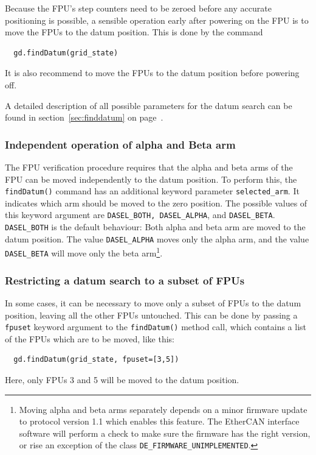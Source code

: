 \documentclass[11pt,a4paper]{report}
\begin{document}
Because the FPU's step counters need to be zeroed
before any accurate positioning is possible, a
sensible operation early after powering on
the FPU is to move the FPUs to the datum position.
This is done by the command

\begin{verbatim}
  gd.findDatum(grid_state)
\end{verbatim}

It is also recommend to move the FPUs to the datum position
before powering off. 

A detailed description of all possible
parameters for the datum search can be found in
section~\ref{sec:finddatum} on page~\pageref{sec:finddatum}.


\subsubsection{Independent operation of alpha and Beta arm}

The FPU verification procedure requires that the alpha and beta arms
of the FPU can be moved independently to the datum position.  To
perform this, the \texttt{findDatum()} command has an additional
keyword parameter \texttt{selected\_arm}. It indicates which arm
should be moved to the zero position. The possible values of this
keyword argument are \texttt{DASEL\_BOTH, DASEL\_ALPHA}, and
\texttt{DASEL\_BETA}.  \texttt{DASEL\_BOTH} is the default behaviour:
Both alpha and beta arm are moved to the datum position. The value
\texttt{DASEL\_ALPHA} moves only the alpha arm, and the value
\texttt{DASEL\_BETA} will move only the beta arm\footnote{Moving alpha
  and beta arms separately depends on a minor firmware update to
  protocol version 1.1 which enables this feature. The EtherCAN interface software
  will perform a check to make sure the firmware has the right
  version, or rise an exception of the class
  \texttt{DE\_FIRMWARE\_UNIMPLEMENTED}.}.


\subsubsection{Restricting a datum search to a subset of FPUs}
\label{sec:restricteddatumsearch}
  
In some cases, it can be necessary to move only a subset of FPUs to
the datum position, leaving all the other FPUs untouched. This can be
done by passing a \texttt{fpuset} keyword argument to the
\texttt{findDatum()} method call, which contains a list of the FPUs
which are to be moved, like this:
\begin{verbatim}
  gd.findDatum(grid_state, fpuset=[3,5])
\end{verbatim}
Here, only FPUs 3 and 5 will be moved to the datum position.
\end{document}
